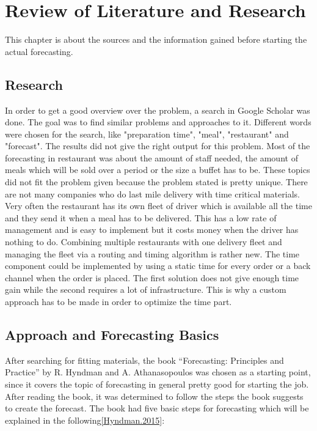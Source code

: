 \renewcommand{\thepage}{\arabic{page}}
\chapter{Review of Literature and Research}\label{chapter:Review of Literature and Research}
This chapter is about the sources and the information gained before starting the actual forecasting.
\section{Research}\label{section:Research}
In order to get a good overview over the problem, a search in Google Scholar was done. The goal was to find similar problems and approaches to it. Different words were chosen for the search, like "preparation time", "meal", "restaurant" and "forecast". The results did not give the right output for this problem. Most of the forecasting in restaurant was about the amount of staff needed, the amount of meals which will be sold over a period or the size a buffet has to
be. These topics did not fit the problem given because the problem stated is pretty unique. There are not many companies who do last mile delivery with time critical materials. Very often the restaurant has its own fleet of driver which is available all the time and they send it when a meal has to be delivered. This has a low rate of management and is easy to implement but it costs money when the driver has nothing to do. Combining multiple restaurants with one delivery fleet and managing the fleet via a routing and timing algorithm is rather new. The time component could be implemented by using a static time for every order or a back channel when the order is placed. The first solution does not give enough time gain while the second requires a lot of infrastructure. This is why a custom approach has to be made in order to optimize the time part.
\section{Approach and Forecasting Basics}\label{section:Approach and Basics}
After searching for fitting materials, the book “Forecasting: Principles and Practice” by R. Hyndman and A. Athanasopoulos was chosen as a starting point, since it covers the topic of forecasting in general pretty good for starting the job. After reading the book, it was determined to follow the steps the book suggests to create the forecast. The book had five basic steps for forecasting which will be explained in the following\ref{Hyndman.2015}:

